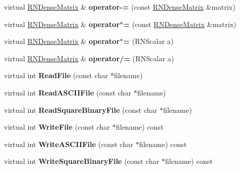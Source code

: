 \begin{DoxyCompactItemize}
\item 
virtual \hyperlink{class_r_n_dense_matrix}{R\+N\+Dense\+Matrix} \& {\bfseries operator-\/=} (const \hyperlink{class_r_n_dense_matrix}{R\+N\+Dense\+Matrix} \&matrix)\hypertarget{class_r_n_dense_matrix_a1f439c103410351d4c5dce176be90a43}{}\label{class_r_n_dense_matrix_a1f439c103410351d4c5dce176be90a43}

\item 
virtual \hyperlink{class_r_n_dense_matrix}{R\+N\+Dense\+Matrix} \& {\bfseries operator$\ast$=} (const \hyperlink{class_r_n_dense_matrix}{R\+N\+Dense\+Matrix} \&matrix)\hypertarget{class_r_n_dense_matrix_a5c392d8b5ead5ca5b37d10235e7d364a}{}\label{class_r_n_dense_matrix_a5c392d8b5ead5ca5b37d10235e7d364a}

\item 
virtual \hyperlink{class_r_n_dense_matrix}{R\+N\+Dense\+Matrix} \& {\bfseries operator$\ast$=} (R\+N\+Scalar a)\hypertarget{class_r_n_dense_matrix_a7b3b1dc9ea68b133f0ec0659fdee2152}{}\label{class_r_n_dense_matrix_a7b3b1dc9ea68b133f0ec0659fdee2152}

\item 
virtual \hyperlink{class_r_n_dense_matrix}{R\+N\+Dense\+Matrix} \& {\bfseries operator/=} (R\+N\+Scalar a)\hypertarget{class_r_n_dense_matrix_a2dc9e136149dba80569068a06a0b38e4}{}\label{class_r_n_dense_matrix_a2dc9e136149dba80569068a06a0b38e4}

\item 
virtual int {\bfseries Read\+File} (const char $\ast$filename)\hypertarget{class_r_n_dense_matrix_a9a8c49103a9e578462bf8d855f6f93f5}{}\label{class_r_n_dense_matrix_a9a8c49103a9e578462bf8d855f6f93f5}

\item 
virtual int {\bfseries Read\+A\+S\+C\+I\+I\+File} (const char $\ast$filename)\hypertarget{class_r_n_dense_matrix_a7bf67b822c1d0077dd8cdd6eadee1fb2}{}\label{class_r_n_dense_matrix_a7bf67b822c1d0077dd8cdd6eadee1fb2}

\item 
virtual int {\bfseries Read\+Square\+Binary\+File} (const char $\ast$filename)\hypertarget{class_r_n_dense_matrix_acfeb7646a29a4ad72ab65e2542273aaa}{}\label{class_r_n_dense_matrix_acfeb7646a29a4ad72ab65e2542273aaa}

\item 
virtual int {\bfseries Write\+File} (const char $\ast$filename) const \hypertarget{class_r_n_dense_matrix_a95028210a424befd2715853ddf6e439b}{}\label{class_r_n_dense_matrix_a95028210a424befd2715853ddf6e439b}

\item 
virtual int {\bfseries Write\+A\+S\+C\+I\+I\+File} (const char $\ast$filename) const \hypertarget{class_r_n_dense_matrix_a8ea2a052624904070350b467b7fce78b}{}\label{class_r_n_dense_matrix_a8ea2a052624904070350b467b7fce78b}

\item 
virtual int {\bfseries Write\+Square\+Binary\+File} (const char $\ast$filename) const \hypertarget{class_r_n_dense_matrix_afe41e7192cf86b7af3d8b50388d1412e}{}\label{class_r_n_dense_matrix_afe41e7192cf86b7af3d8b50388d1412e}

\end{DoxyCompactItemize}
